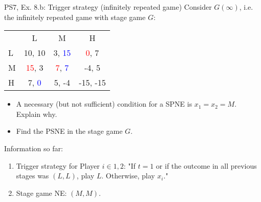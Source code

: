 \begin{frame}{PS7, Ex. 8.b: Trigger strategy (infinitely repeated game)}
    Consider $G(\infty)$, i.e. the infinitely repeated game with stage game $G$: \vspace{-6pt}
    \begin{table}
      \begin{tabular}{l|c|c|c|}
        \multicolumn{1}{c}{} & \multicolumn{1}{c}{L} & \multicolumn{1}{c}{M} & \multicolumn{1}{c}{H} \\\cline{2-4}
        L & 10, 10 & 3, \textcolor{blue}{15} & \textcolor{red}{0}, 7 \\\cline{2-4}
        M & \textcolor{red}{15}, 3 & \textcolor{red}{7}, \textcolor{blue}{7} & -4, 5 \\\cline{2-4}
        H & 7, \textcolor{blue}{0} & 5, -4 & -15, -15 \\\cline{2-4}
      \end{tabular}
    \end{table}
    \begin{itemize}
      \item[(b)] A necessary (but not sufficient) condition for a SPNE is $x_1 = x_2 = M$. Explain why.
    \end{itemize}
    \begin{multicols}{2}
      \begin{itemize}
        \item[(Step a)] Find the PSNE in the stage game $G$.
      \end{itemize}
      \vfill\null\columnbreak
      Information so far:
      \begin{enumerate}
        \item Trigger strategy for Player $i\in1,2$: "If $t=1$ or if the outcome in all previous stages was $(L,L)$, play $L$. Otherwise, play $x_i$."
        \item Stage game NE: $(M,M)$.
      \end{enumerate}
      \vfill\null
    \end{multicols}
\end{frame}
